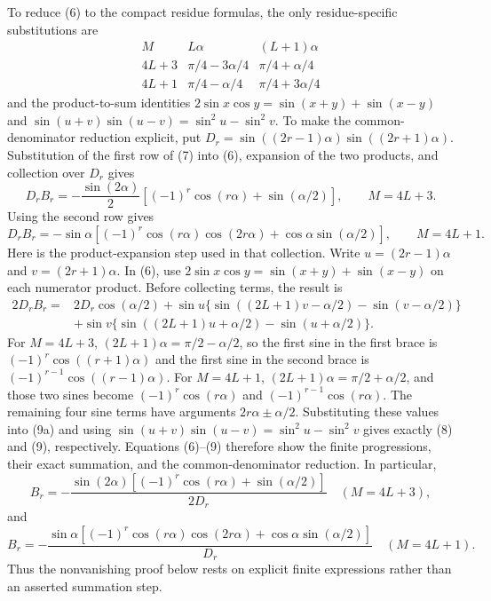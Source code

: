 \documentclass[11pt]{article}
\begin{document}
To reduce (6) to the compact residue formulas, the only residue-specific substitutions are
\[
\begin{array}{c|cc}
 M & L\alpha &(L+1)\alpha\\ \hline
 4L+3 & \pi/4-3\alpha/4 & \pi/4+\alpha/4\\
 4L+1 & \pi/4-\alpha/4 & \pi/4+3\alpha/4
\end{array} \tag{7}
\]
and the product-to-sum identities $2\sin x\cos y=\sin(x+y)+\sin(x-y)$ and $\sin(u+v)\sin(u-v)=\sin^2u-\sin^2v$. To make the common-denominator reduction explicit, put
$D_r=\sin((2r-1)\alpha)\sin((2r+1)\alpha)$. Substitution of the first row of (7) into (6), expansion of the two products, and collection over $D_r$ gives
\[
 D_r B_r=-\frac{\sin(2\alpha)}{2}
 \left[(-1)^r\cos(r\alpha)+\sin(\alpha/2)\right],
 \qquad M=4L+3. \tag{8}
\]
Using the second row gives
\[
 D_r B_r=-\sin\alpha
 \left[(-1)^r\cos(r\alpha)\cos(2r\alpha)
       +\cos\alpha\sin(\alpha/2)\right],
 \qquad M=4L+1. \tag{9}
\]
Here is the product-expansion step used in that collection. Write $u=(2r-1)\alpha$ and $v=(2r+1)\alpha$. In (6), use $2\sin x\cos y=\sin(x+y)+\sin(x-y)$ on each numerator product. Before collecting terms, the result is
\begin{equation}
\begin{aligned}
2D_rB_r={}&2D_r\cos(\alpha/2)
+\sin u\{\sin((2L+1)v-\alpha/2)-\sin(v-\alpha/2)\}\\
&+\sin v\{\sin((2L+1)u+\alpha/2)-\sin(u+\alpha/2)\}.
\end{aligned}
\tag{9a}
\end{equation}
For $M=4L+3$, $(2L+1)\alpha=\pi/2-\alpha/2$, so the first sine in the first brace is $(-1)^r\cos((r+1)\alpha)$ and the first sine in the second brace is $(-1)^{r-1}\cos((r-1)\alpha)$. For $M=4L+1$, $(2L+1)\alpha=\pi/2+\alpha/2$, and those two sines become $(-1)^r\cos(r\alpha)$ and $(-1)^{r-1}\cos(r\alpha)$. The remaining four sine terms have arguments $2r\alpha\pm\alpha/2$. Substituting these values into (9a) and using $\sin(u+v)\sin(u-v)=\sin^2u-\sin^2v$ gives exactly (8) and (9), respectively. Equations (6)--(9) therefore show the finite progressions, their exact summation, and the common-denominator reduction. In particular,
\[
 B_r=-\frac{\sin(2\alpha)[(-1)^r\cos(r\alpha)+\sin(\alpha/2)]}{2D_r}
 \quad(M=4L+3), \tag{10}
\]
and
\[
 B_r=-\frac{\sin\alpha[(-1)^r\cos(r\alpha)\cos(2r\alpha)
                    +\cos\alpha\sin(\alpha/2)]}{D_r}
 \quad(M=4L+1). \tag{11}
\]
Thus the nonvanishing proof below rests on explicit finite expressions rather than an asserted summation step.
\end{document}

